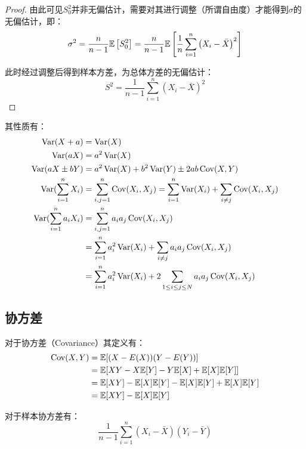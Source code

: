 \documentclass[11pt]{article}
\begin{document}
\begin{proof}
    由此可见$S_0^2$并非无偏估计，需要对其进行调整（所谓自由度）才能得到$\sigma$的无偏估计，即：
    \begin{equation*}
        \sigma^2
        = \frac{n}{n-1} \mathbb{E}\left[S_0^2\right]
        = \frac{n}{n-1} \mathbb{E} \left[\frac{1}{n} \sum_{i=1}^{n} \left( X_i - \bar{X} \right)^2 \right]
    \end{equation*}

    此时经过调整后得到样本方差，为总体方差的无偏估计：
    \begin{equation*}
        S^2 = \frac{1}{n-1} \sum_{i=1}^{n} \left(X_i - \bar{X} \right)^2
    \end{equation*}
\end{proof}

其性质有：
\begin{align*}
    \operatorname{Var}(X + a) &= \operatorname{Var}(X) \\
    \operatorname{Var}(aX) &= a^2\operatorname{Var}(X) \\
    \operatorname{Var}(aX \pm bY) &= a^2\operatorname{Var}(X) + b^2\operatorname{Var}(Y) \pm 2ab \operatorname{Cov}(X,Y) \\
    \operatorname{Var}(\sum_{i=1}^{n} X_i) &= \sum_{i,j=1}^{n}\operatorname{Cov}(X_i,X_j) = \sum_{i=1}^{n}\operatorname{Var}(X_i) + \sum_{i \neq j}\operatorname{Cov}(X_i,X_j) \\
    \operatorname{Var}(\sum_{i=1}^{n} a_i X_i) &= \sum_{i,j=1}^{n}a_i a_j\operatorname{Cov}(X_i,X_j) \\
    &= \sum_{i=1}^{n}a_i^2\operatorname{Var}(X_i) + \sum_{i \neq j} a_i a_j \operatorname{Cov}(X_i,X_j) \\
    &= \sum_{i=1}^{n}a_i^2\operatorname{Var}(X_i) + 2\sum_{1 \leq i \leq j \leq N} a_i a_j \operatorname{Cov}(X_i,X_j)
\end{align*}

\subsection{协方差}

对于协方差（Covariance）其定义有：
\begin{align*}
    \operatorname{Cov}(X,Y) &= \mathbb{E}[(X-E(X))(Y-E(Y))] \\
    &= \mathbb{E}[XY - X\mathbb{E}[Y] -Y\mathbb{E}[X]+ \mathbb{E}[X]\mathbb{E}[Y]] \\
    &= \mathbb{E}[XY] - \mathbb{E}[X]\mathbb{E}[Y] - \mathbb{E}[X]\mathbb{E}[Y] + \mathbb{E}[X]\mathbb{E}[Y] \\
    &= \mathbb{E}[XY] - \mathbb{E}[X]\mathbb{E}[Y]
\end{align*}

对于样本协方差有：
\begin{equation*}
    \frac{1}{n-1} \sum_{i=1}^{n} \left(X_i - \bar{X} \right) \left(Y_i - \bar{Y} \right)
\end{equation*}
\end{document}
